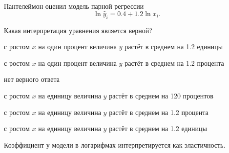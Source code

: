 
\begin{question}
Пантелеймон оценил модель парной регрессии
\[
\ln \hat y_i = 0.4 + 1.2 \ln x_i.
\]

Какая интерпретация уравнения является верной?
\begin{answerlist}
  \item с ростом \(x\) на один процент величина \(y\) растёт в среднем на 1.2 единицы
  \item с ростом \(x\) на один процент величина \(y\) растёт в среднем на 1.2 процента
  \item нет верного ответа
  \item с ростом \(x\) на единицу величина \(y\) растёт в среднем на 120 процентов
  \item с ростом \(x\) на единицу величина \(y\) растёт в среднем на 1.2 процента
  \item с ростом \(x\) на единицу величина \(y\) растёт в среднем на 1.2 единицы
\end{answerlist}
\end{question}

\begin{solution}
Коэффициент у модели в логарифмах интерпретируется как эластичность.
\end{solution}

